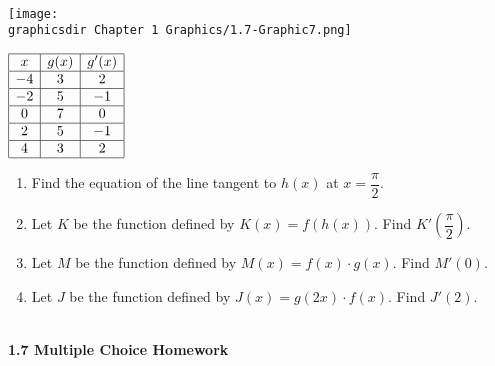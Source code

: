  \\
\begin{minipage}[t]{0.75\textwidth} \vspace{0pt}%
    \texttt{[image: \\graphicsdir Chapter 1 Graphics/1.7-Graphic7.png]}
\end{minipage} \hfill \begin{minipage}[t]{0.2\textwidth} \vspace{11pt}%
    \def\arraystretch{1.4}
    $\begin{array}{|c|c|c|}
        \hline
        x & g(x) & g'(x) \\ \hline
        -4 & 3 & 2 \\ \hline
        -2 & 5 & -1 \\ \hline
        0 & 7 & 0 \\ \hline
        2 & 5 & -1 \\ \hline
        4 & 3 & 2 \\
        \hline
    \end{array}$
\end{minipage} 

\begin{enumerate}[label=\hspace{11pt}(\alph*), align=left, leftmargin=*, labelsep=0.25em]
    \item Find the equation of the line tangent to $h(x)$ at $x = \dfrac{\pi}{2}$.
    \item Let $K$ be the function defined by $K(x) = f(h(x))$. Find $K'\left(\dfrac{\pi}{2}\right)$.
    \item Let $M$ be the function defined by $M(x) = f(x) \cdot g(x)$. Find $M'(0)$.
    \item Let $J$ be the function defined by $J(x) = g(2x) \cdot f(x)$. Find $J'(2)$.
\end{enumerate} \vspace{11pt}

 \\[11pt]

\textbf{\large{1.7 Multiple Choice Homework}} \par

